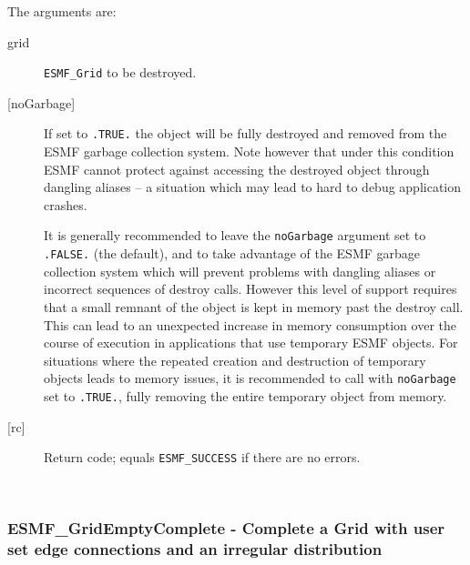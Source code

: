    The arguments are:
   \begin{description}
   \item[grid]
        {\tt ESMF\_Grid} to be destroyed.
   \item[{[noGarbage]}]
        If set to {\tt .TRUE.} the object will be fully destroyed and removed
        from the ESMF garbage collection system. Note however that under this
        condition ESMF cannot protect against accessing the destroyed object
        through dangling aliases -- a situation which may lead to hard to debug
        application crashes.
  
        It is generally recommended to leave the {\tt noGarbage} argument
        set to {\tt .FALSE.} (the default), and to take advantage of the ESMF
        garbage collection system which will prevent problems with dangling
        aliases or incorrect sequences of destroy calls. However this level of
        support requires that a small remnant of the object is kept in memory
        past the destroy call. This can lead to an unexpected increase in memory
        consumption over the course of execution in applications that use
        temporary ESMF objects. For situations where the repeated creation and
        destruction of temporary objects leads to memory issues, it is
        recommended to call with {\tt noGarbage} set to {\tt .TRUE.}, fully
        removing the entire temporary object from memory.
   \item[{[rc]}]
        Return code; equals {\tt ESMF\_SUCCESS} if there are no errors.
   \end{description}
   
 
\mbox{}\hrulefill\ 
 
\subsubsection [ESMF\_GridEmptyComplete] {ESMF\_GridEmptyComplete - Complete a Grid with user set edge connections and an irregular distribution}


